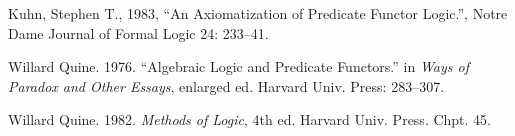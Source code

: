 \documentclass[12pt]{article}
\theoremstyle{plain}
\theoremstyle{definition}
\numberwithin{equation}{section}
\begin{document}
\begin{thebibliography}{99}
Kuhn, Stephen T., 1983, ``An Axiomatization of Predicate Functor Logic.'', Notre Dame Journal of Formal Logic 24: 
233--41. 

Willard Quine. 1976. ``Algebraic Logic and Predicate Functors.'' in {\em Ways of Paradox and Other Essays}, enlarged ed. Harvard Univ. Press: 283--307.

Willard Quine. 1982. {\em Methods of Logic}, 4th ed. Harvard Univ. Press. Chpt. 45. 

\end{thebibliography}

\end{document}
